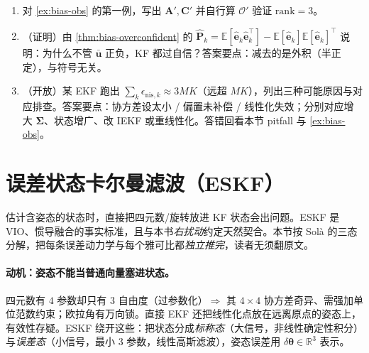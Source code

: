 \begin{practice}
\begin{enumerate}
  \item 对 \cref{ex:bias-obs} 的第一例，写出 $\mathbf{A}',\mathbf{C}'$ 并自行算 $\mathcal{O}'$ 验证 $\mathrm{rank}=3$。
  \item （证明）由 \cref{thm:bias-overconfident} 的 $\hat{\mathbf{P}}_k=\mathbb{E}[\hat{\mathbf{e}}_k\hat{\mathbf{e}}_k^\top]-\mathbb{E}[\hat{\mathbf{e}}_k]\mathbb{E}[\hat{\mathbf{e}}_k]^\top$ 说明：为什么不管 $\bar{\mathbf{u}}$ 正负，KF 都过自信？答案要点：减去的是外积（半正定），与符号无关。
  \item （开放）某 EKF 跑出 $\sum_k\epsilon_{\text{nis},k}\approx 3MK$（远超 $MK$），列出三种可能原因与对应排查。答案要点：协方差设太小 / 偏置未补偿 / 线性化失效；分别对应增大 $\boldsymbol{\Sigma}$、状态增广、改 IEKF 或重线性化。答错回看本节 pitfall 与 \cref{ex:bias-obs}。
\end{enumerate}
\end{practice}

\section{误差状态卡尔曼滤波（ESKF）}
\label{sec:eskf}

估计含姿态的状态时，直接把四元数/旋转放进 KF 状态会出问题。ESKF 是 VIO、惯导融合的事实标准\cite{sola2017quaternion}，且与本书\emph{右扰动}约定天然契合。本节按 Solà\cite{sola2017quaternion} 的三态分解，把每条误差动力学与每个雅可比都\emph{独立推完}，读者无须翻原文。

\paragraph{动机：姿态不能当普通向量塞进状态。}
四元数有 $4$ 参数却只有 $3$ 自由度（过参数化）$\Rightarrow$ 其 $4\times4$ 协方差奇异、需强加单位范数约束；欧拉角有万向锁。直接 EKF 还把线性化点放在远离原点的姿态上，有效性存疑。ESKF 绕开这些：把状态分成\emph{标称态}（大信号，非线性确定性积分）与\emph{误差态}（小信号，最小 $3$ 参数，线性高斯滤波），姿态误差用 $\delta\boldsymbol{\theta}\in\mathbb{R}^3$ 表示。

